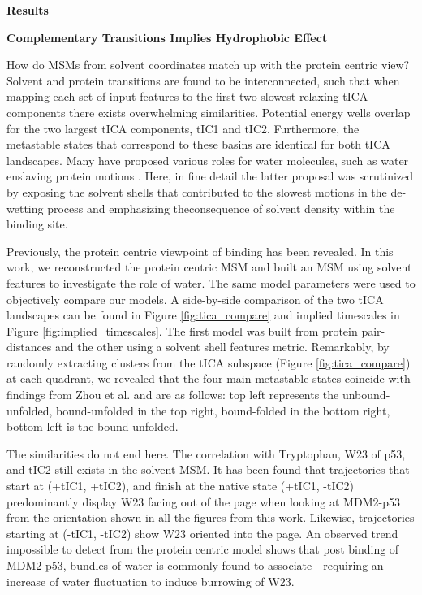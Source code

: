 
\textbf{Results}

\textbf{Complementary Transitions Implies Hydrophobic Effect}

How do MSMs from solvent coordinates match up with the protein centric view? Solvent and protein transitions are found to be interconnected, such that when mapping each set of input features to the first two slowest-relaxing tICA components there exists overwhelming similarities. Potential energy wells overlap for the two largest tICA components, tIC1 and tIC2. Furthermore, the metastable states that correspond to these basins are identical for both tICA landscapes. Many have proposed various roles for water molecules, such as water enslaving protein motions \cite{bellissent2016water}. Here, in fine detail the latter proposal was scrutinized by exposing the solvent shells that contributed to the slowest motions in the de-wetting process and emphasizing theconsequence of solvent density within the binding site.

Previously, the protein centric viewpoint of binding has been revealed. In this work, we reconstructed the protein centric MSM and built an MSM using solvent features to investigate the role of water. The same model parameters were used to objectively compare our models. A side-by-side comparison of the two tICA landscapes can be found in Figure \ref{fig:tica_compare} and implied timescales in Figure \ref{fig:implied_timescales}. The first model was built from protein pair-distances and the other using a solvent shell features metric. Remarkably, by randomly extracting clusters from the tICA subspace (Figure \ref{fig:tica_compare}) at each quadrant, we revealed that the four main metastable states coincide with findings from Zhou et al. and are as follows: top left represents the unbound-unfolded, bound-unfolded in the top right, bound-folded in the bottom right, bottom left is the bound-unfolded.

The similarities do not end here. The correlation with Tryptophan, W23 of p53, and tIC2
still exists in the solvent MSM. It has been found that trajectories that start at (+tIC1, +tIC2), and finish at the native state (+tIC1, -tIC2) predominantly display W23 facing out of the page when looking at MDM2-p53 from the orientation shown in all the figures from this work. Likewise, trajectories starting at (-tIC1, -tIC2) show W23 oriented into the page.  An observed trend impossible to detect from the protein centric model shows that post binding of MDM2-p53, bundles of water is commonly found to associate—requiring an increase of water fluctuation to induce burrowing of W23.


